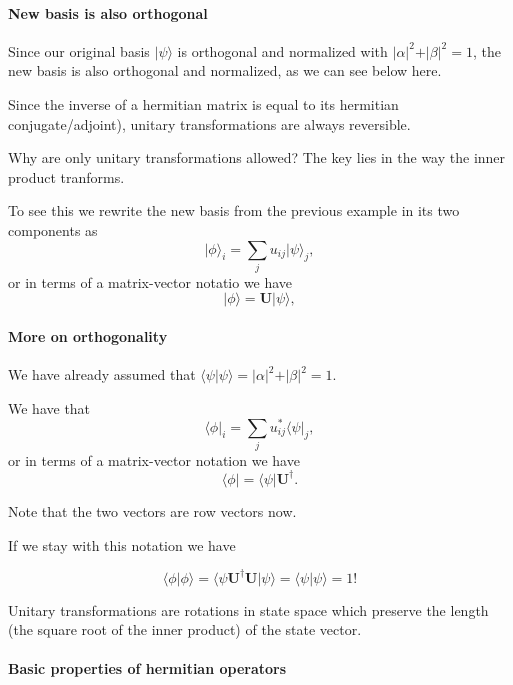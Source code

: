 \paragraph{New basis is also orthogonal}

Since our original basis $\vert \psi\rangle$ is orthogonal and normalized with $\vert\alpha\vert^2+\vert\beta\vert^2=1$, the new basis is also orthogonal and normalized, as we can see below here.

Since the inverse of a hermitian matrix is equal to its hermitian
conjugate/adjoint), unitary transformations are always reversible.

Why are only unitary transformations allowed? The key lies in the way the inner product tranforms.

To see this we rewrite the new basis from the previous example in its two components as
\[
\vert \phi\rangle_i=\sum_{j}u_{ij}\vert \psi\rangle_j,
\]
or in terms of a matrix-vector notatio we have
\[
\vert \phi\rangle=\bm{U}\vert \psi\rangle,
\]


\paragraph{More on orthogonality}

We have already assumed that $\langle \psi \vert \psi \rangle = \vert\alpha\vert^2+\vert\beta\vert^2=1$.

We have that 
\[
\langle \phi\vert_i=\sum_{j}u_{ij}^*\langle \psi\vert_j,
\]
or in terms of a matrix-vector notation we have
\[
\langle \phi\vert=\langle \psi\vert\bm{U}^{\dagger}.
\]

Note that the two vectors are row vectors now.

If we stay with this notation we have

\[
\langle \phi\vert\phi\rangle = \langle \psi \bm{U}^{\dagger}\bm{U}\vert \psi\rangle = \langle \psi\vert \psi\rangle=1!
\]

Unitary transformations are rotations in state space which preserve the
length (the square root of the inner product) of the state vector.





\paragraph{Basic properties of hermitian operators}

